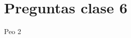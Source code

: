 \documentclass[../main_ej.tex]{subfiles}
\begin{document}
\section{Preguntas clase 6}
Peo 2
 
\end{document}
